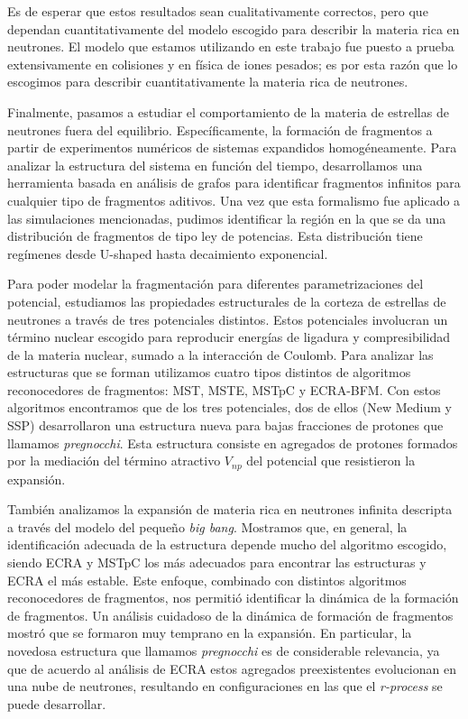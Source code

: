Es de esperar que estos resultados sean cualitativamente correctos, pero que dependan cuantitativamente del modelo escogido para describir la materia rica en neutrones.
El modelo que estamos utilizando en este trabajo fue puesto a prueba extensivamente en colisiones y en física de iones pesados; es por esta razón que lo escogimos para describir cuantitativamente la materia rica de neutrones.


Finalmente, pasamos a estudiar el comportamiento de la materia de estrellas de neutrones fuera del equilibrio.
Específicamente, la formación de fragmentos a partir de experimentos numéricos de sistemas expandidos homogéneamente.
Para analizar la estructura del sistema en función del tiempo, desarrollamos una herramienta basada en análisis de grafos para identificar fragmentos infinitos para cualquier tipo de fragmentos aditivos.
Una vez que esta formalismo fue aplicado a las simulaciones mencionadas, pudimos identificar la región en la que se da una distribución de fragmentos de tipo ley de potencias.
Esta distribución tiene regímenes desde U-shaped hasta decaimiento exponencial.

Para poder modelar la fragmentación para diferentes parametrizaciones del potencial, estudiamos las propiedades estructurales de la corteza de estrellas de neutrones a través de tres potenciales distintos.
Estos potenciales involucran un término nuclear escogido para reproducir energías de ligadura y compresibilidad de la materia nuclear, sumado a la interacción de Coulomb.
Para analizar las estructuras que se forman utilizamos cuatro tipos distintos de algoritmos reconocedores de fragmentos: MST, MSTE, MSTpC y ECRA-BFM.\@
Con estos algoritmos encontramos que de los tres potenciales, dos de ellos (New Medium y SSP) desarrollaron una estructura nueva para bajas fracciones de protones que llamamos \emph{pregnocchi}.
Esta estructura consiste en agregados de protones formados por la mediación del término atractivo $V_{np}$ del potencial que resistieron la expansión.

También analizamos la expansión de materia rica en neutrones infinita descripta a través del modelo del pequeño \emph{big bang}.
Mostramos que, en general, la identificación adecuada de la estructura depende mucho del algoritmo escogido, siendo ECRA y MSTpC los más adecuados para encontrar las estructuras y ECRA el más estable.
Este enfoque, combinado con distintos algoritmos reconocedores de fragmentos, nos permitió identificar la dinámica de la formación de fragmentos.
Un análisis cuidadoso de la dinámica de formación de fragmentos mostró que se formaron muy temprano en la expansión.
En particular, la novedosa estructura que llamamos \emph{pregnocchi} es de considerable relevancia, ya que de acuerdo al análisis de ECRA estos agregados preexistentes evolucionan en una nube de neutrones, resultando en configuraciones en las que el \emph{r-process} se puede desarrollar.


